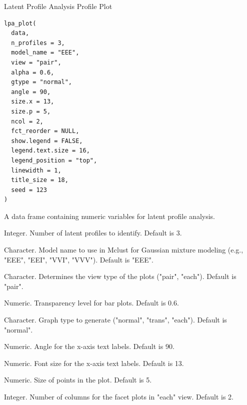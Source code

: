 \documentclass[a4paper]{book}
\begin{document}
%
\begin{Description}
Latent Profile Analysis Profile Plot
\end{Description}
%
\begin{Usage}
\begin{verbatim}
lpa_plot(
  data,
  n_profiles = 3,
  model_name = "EEE",
  view = "pair",
  alpha = 0.6,
  gtype = "normal",
  angle = 90,
  size.x = 13,
  size.p = 5,
  ncol = 2,
  fct_reorder = NULL,
  show.legend = FALSE,
  legend.text.size = 16,
  legend_position = "top",
  linewidth = 1,
  title_size = 18,
  seed = 123
)
\end{verbatim}
\end{Usage}
%
\begin{Arguments}
\begin{ldescription}
\item[\code{data}] A data frame containing numeric variables for latent profile analysis.

\item[\code{n\_profiles}] Integer. Number of latent profiles to identify. Default is 3.

\item[\code{model\_name}] Character. Model name to use in Mclust for Gaussian mixture modeling (e.g., "EEE", "EEI", "VVI", "VVV"). Default is "EEE".

\item[\code{view}] Character. Determines the view type of the plots ("pair", "each"). Default is "pair".

\item[\code{alpha}] Numeric. Transparency level for bar plots. Default is 0.6.

\item[\code{gtype}] Character. Graph type to generate ("normal", "trans", "each"). Default is "normal".

\item[\code{angle}] Numeric. Angle for the x-axis text labels. Default is 90.

\item[\code{size.x}] Numeric. Font size for the x-axis text labels. Default is 13.

\item[\code{size.p}] Numeric. Size of points in the plot. Default is 5.

\item[\code{ncol}] Integer. Number of columns for the facet plots in "each" view. Default is 2.


\end{ldescription}
\end{Arguments}
\end{document}
